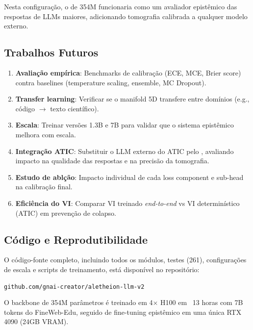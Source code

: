 Nesta configura\c{c}\~ao, o \aletheion{} de 354M funcionaria como um
avaliador epist\^emico das respostas de LLMs maiores, adicionando
tomografia calibrada a qualquer modelo externo.

\subsection{Trabalhos Futuros}

\begin{enumerate}
    \item \textbf{Avalia\c{c}\~ao emp\'irica}: Benchmarks de calibra\c{c}\~ao
    (ECE, MCE, Brier score) contra baselines (temperature scaling,
    ensemble, MC Dropout).

    \item \textbf{Transfer learning}: Verificar se o manifold 5D
    transfere entre dom\'inios (e.g., c\'odigo $\to$ texto cient\'ifico).

    \item \textbf{Escala}: Treinar vers\~oes 1.3B e 7B para validar
    que o sistema epist\^emico melhora com escala.

    \item \textbf{Integra\c{c}\~ao ATIC}: Substituir o LLM externo do
    ATIC pelo \aletheion{}, avaliando impacto na qualidade das respostas
    e na precis\~ao da tomografia.

    \item \textbf{Estudo de abl\c{c}\~ao}: Impacto individual de cada
    loss component e sub-head na calibra\c{c}\~ao final.

    \item \textbf{Efici\^encia do VI}: Comparar VI treinado
    \textit{end-to-end} vs VI determin\'istico (ATIC) em preven\c{c}\~ao
    de colapso.
\end{enumerate}

\subsection{C\'odigo e Reprodutibilidade}

O c\'odigo-fonte completo, incluindo todos os m\'odulos, testes (261),
configura\c{c}\~oes de escala e scripts de treinamento, est\'a dispon\'ivel
no reposit\'orio:

\begin{center}
    \texttt{github.com/gnai-creator/aletheion-llm-v2}
\end{center}

O backbone de 354M par\^ametros \'e treinado em 4$\times$ H100 em
~13 horas com 7B tokens do FineWeb-Edu, seguido de fine-tuning
epist\^emico em uma \'unica RTX 4090 (24GB VRAM).
